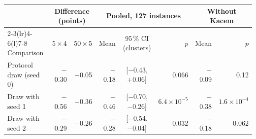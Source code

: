 \begin{tabular}{@{}lrrrcrrr@{}}
\toprule
 & \multicolumn{2}{c}{Difference (points)} & \multicolumn{3}{c}{Pooled, 127 instances} & \multicolumn{2}{c}{Without Kacem} \\
\cmidrule(lr){2-3}\cmidrule(lr){4-6}\cmidrule(l){7-8}
Comparison & $5 \times 4$ & $50 \times 5$ & Mean & 95\,\% CI (clusters) & $p$ & Mean & $p$ \\
\midrule
Protocol draw (seed 0) & $-$0.30 & $-$0.05 & $-$0.18 & [$-$0.43, +0.06] & 0.066 & $-$0.09 & 0.12 \\
Draw with seed 1 & $-$0.56 & $-$0.36 & $-$0.46 & [$-$0.70, $-$0.26] & $6.4 \times 10^{-5}$ & $-$0.38 & $1.6 \times 10^{-4}$ \\
Draw with seed 2 & $-$0.29 & $-$0.26 & $-$0.28 & [$-$0.54, $-$0.04] & 0.032 & $-$0.18 & 0.062 \\
\bottomrule
\end{tabular}

